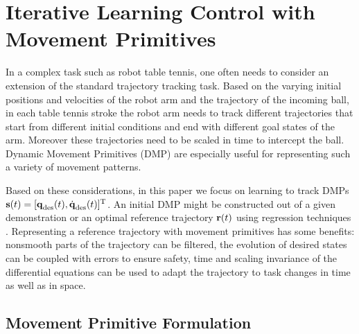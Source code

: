 \section{Iterative Learning Control with Movement Primitives}\label{method}

In a complex task such as robot table tennis, one often needs to consider an extension of the standard trajectory tracking task. Based on the varying initial positions and velocities of the robot arm and the trajectory of the incoming ball, in each table tennis stroke the robot arm needs to track different trajectories that start from different initial conditions and end with different goal states of the arm. Moreover these trajectories need to be scaled in time to intercept the ball. Dynamic Movement Primitives (DMP) are especially useful for representing such a variety of movement patterns.


Based on these considerations, in this paper we focus on learning to track DMPs $\boldsymbol{\mathrm{s}}(t) = [\boldsymbol{\mathrm{q}}_{\text{des}}(t),\dot{\boldsymbol{\mathrm{q}}}_{\text{des}}(t)]^{\mathrm{T}}$. An initial DMP might be constructed out of a given demonstration or an optimal reference trajectory $\boldsymbol{\mathrm{r}}(t)$ using regression techniques \cite{Ijspeert13}. Representing a reference trajectory with movement primitives has some benefits: nonsmooth parts of the trajectory can be filtered, the evolution of desired states can be coupled with errors to ensure safety, time and scaling invariance of the differential equations can be used to adapt the trajectory to task changes in time as well as in space. %

\subsection{Movement Primitive Formulation}

